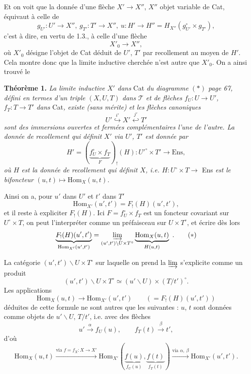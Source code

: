 \documentclass[11pt]{article}
\newcommand{\printedpage}[1]{\marginpar{\footnotesize p.~#1}}
\newcommand{\msp}[1]{\marginpar{\footnotesize [#1]}}
\newcommand{\Hom}{\mathrm{Hom}}
\newcommand{\Ens}{\mathrm{Ens}}
\begin{document}
Et on voit que la donnée d'une flèche $X'\longrightarrow X''$, $X''$ objet variable de Cat, équivaut à celle de
\[
g_{U'} : U'\longrightarrow X'',\ g_{T'} : T'\longrightarrow X'',\ u : H'\longrightarrow H'' = H_{X''}(g_{U'}^{\circ}\times g_{T'}),
\]
c'est à dire, en vertu de 1.3., à celle d'une flèche
\[
X'_0 \longrightarrow X'',
\]
où $X'_0$ désigne l'objet de Cat déduit de $U'$, $T'$ par recollement au moyen de $H'$. Cela montre donc que la limite inductive cherchée n'est autre que $X'_0$. On a ainsi trouvé le

\textbf{Théorème 1.} \textit{La limite inductive $X'$ dans} Cat \textit{du diagramme} $(*)$ \textit{page 67, défini en termes d'un triple $(X,U,T)$ dans $\mathcal{T}$ et de flèches $f_U : U\longrightarrow U'$, $f_T : T\longrightarrow T'$ dans} Cat\textit{, existe (sans mérite)} \msp{page 70} \textit{et les flèches canoniques}
\[
U' \overset{i'}{\hookrightarrow} X' \overset{j'}{\hookleftarrow} T'
\]
\textit{sont des immersions ouvertes et fermées complémentaires l'une de l'autre. La donnée de recollement qui définit $X'$ via $U'$, $T'$ est donnée par}
\[
H' = (\underbrace{f_U^{\circ}\times f_T}_{F})_{!}(H) : U'^{\circ}\times T' \longrightarrow \Ens,
\]
\textit{où $H$ est la donnée de recollement qui définit $X$, i.e. $H : U^{\circ}\times T\longrightarrow$} Ens \textit{est le bifoncteur $(u,t)\longmapsto \Hom_X(u,t)$.}

Ainsi on a, pour $u'$ dans $U'$ et $t'$ dans $T'$
\[
\Hom_{X'}(u',t') = F_{!}(H)(u',t'),
\]
et il reste à expliciter $F_{!}(H)$. Ici $F=f_U^{\circ}\times f_T$ est un foncteur covariant sur $U^{\circ}\times T$, on peut l'interpréter comme un préfaisceau sur $U\times T^{\circ}$, et écrire dès lors
\[
\underbrace{F_{!}(H)(u',t')}_{\Hom_{X'}(u',t')} = \varinjlim_{(u',t')\backslash U\times T^{\circ}} \underbrace{\Hom_X(u,t)}_{H(u,t)} \ .
\tag*{$(*)$}
\]

\printedpage{51}
La catégorie $(u',t')\backslash U\times T^{\circ}$ sur laquelle on prend la $\varinjlim$ s'explicite comme un produit
\[
(u',t')\backslash U\times T^{\circ} \simeq (u'\backslash U)\times(T/t')^{\circ}.
\]
Les applications
\[
\Hom_X(u,t)\longrightarrow \Hom_{X'}(u',t') \qquad (=F_{!}(H)(u',t'))
\]
\msp{page 71} déduites de cette formule ne sont autres que les suivantes : $u$, $t$ sont données comme objets de $u'\backslash U$, $T/t'$, i.e. avec des flèches
\[
u'\xrightarrow{\alpha} f_U(u), \qquad f_T(t)\xrightarrow{\beta} t',
\]
d'où
\[
\Hom_X(u,t) \xrightarrow{\text{via } f=f_X:X\to X'} \Hom_{X'}(\underbrace{f(u)}_{f_U(u)},\underbrace{f(t)}_{f_T(t)}) \xrightarrow{\text{via } \alpha,\ \beta} \Hom_{X'}(u',t').
\]
\end{document}
